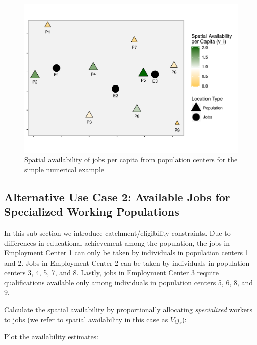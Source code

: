\documentclass[]{elsarticle} %
\begin{document}
\begin{figure}
\includegraphics[width=1\linewidth]{Spatial-Availability_files/figure-latex/toy-example-availability-jobs-per-capita-1} \caption{\label{fig:toy-example-availability-jobs-per-capita}Spatial availability of jobs per capita from population centers for the simple numerical example}\label{fig:toy-example-availability-jobs-per-capita}
\end{figure}

\hypertarget{alternative-use-case-2-available-jobs-for-specialized-working-populations}{%
\subsection{Alternative Use Case 2: Available Jobs for Specialized
Working
Populations}\label{alternative-use-case-2-available-jobs-for-specialized-working-populations}}

In this sub-section we introduce catchment/eligibility constraints. Due
to differences in educational achievement among the population, the jobs
in Employment Center 1 can only be taken by individuals in population
centers 1 and 2. Jobs in Employment Center 2 can be taken by individuals
in population centers 3, 4, 5, 7, and 8. Lastly, jobs in Employment
Center 3 require qualifications available only among individuals in
population centers 5, 6, 8, and 9.

Calculate the spatial availability by proportionally allocating
\emph{specialized} workers to jobs (we refer to spatial availability in
this case as \(V_ij_r\)):

Plot the availability estimates:
\end{document}

